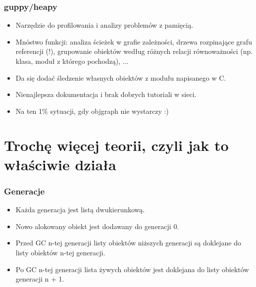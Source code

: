 \documentclass{beamer}
\begin{document}
    \begin{frame}
        \frametitle{guppy/heapy}
        \begin{itemize}
            \item Narzędzie do profilowania i analizy problemów z pamięcią.
            \item Mnóstwo funkcji: analiza ścieżek w grafie zależności, drzewa rozpinające grafu referencji (!), grupowanie obiektów według różnych relacji równoważności (np. klasa, moduł z którego pochodzą), ...
            \item Da się dodać śledzenie własnych obiektów z modułu napisanego w C.
            \item Nienajlepsza dokumentacja i brak dobrych tutoriali w sieci.
            \item Na ten 1\% sytuacji, gdy objgraph nie wystarczy :)
        \end{itemize}
    \end{frame}

\section{Trochę więcej teorii, czyli jak to właściwie działa}
\frame\sectionpage

    \begin{frame}
        \frametitle{Generacje}
        \begin{itemize}
            \item Każda generacja jest listą dwukierunkową.
            \item Nowo alokowany obiekt jest dodawany do generacji 0.
            \item Przed GC n-tej generacji listy obiektów niższych generacji są doklejane do listy obiektów n-tej generacji.
            \item Po GC n-tej generacji lista żywych obiektów jest doklejana do listy obiektów generacji n + 1.
        \end{itemize}
    \end{frame}
\end{document}

